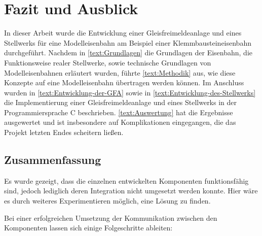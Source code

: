 \chapter{Fazit und Ausblick}\label{text:Fazit-und-Ausblick}

In dieser Arbeit wurde die Entwicklung einer Gleisfreimeldeanlage und eines Stellwerks für eine Modelleisenbahn am Beispiel einer Klemmbausteineisenbahn durchgeführt. Nachdem in \autoref{text:Grundlagen}  die Grundlagen der Eisenbahn, die Funktionsweise realer Stellwerke, sowie technische Grundlagen von Modelleisenbahnen erläutert wurden, führte \autoref{text:Methodik}  aus, wie diese Konzepte auf eine Modelleisenbahn übertragen werden können. Im Anschluss wurden in \autoref{text:Entwicklung-der-GFA}  sowie in \autoref{text:Entwicklung-des-Stellwerks}  die Implementierung einer Gleisfreimeldeanlage und eines Stellwerks in der Programmiersprache C beschrieben. \autoref{text:Auswertung}  hat die Ergebnisse ausgewertet und ist insbesondere auf Komplikationen eingegangen, die das Projekt letzten Endes scheitern ließen.

\section{Zusammenfassung}\label{text:Fazit-und-Ausblick:Zusammenfassung}

Es wurde gezeigt, dass die einzelnen entwickelten Komponenten funktionsfähig sind, jedoch lediglich deren Integration nicht umgesetzt werden konnte. Hier wäre es durch weiteres Experimentieren möglich, eine Lösung zu finden.

Bei einer erfolgreichen Umsetzung der Kommunikation zwischen den Komponenten lassen sich einige Folgeschritte ableiten:

